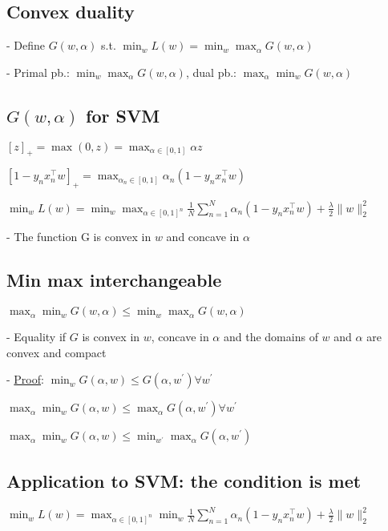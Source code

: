\subsection*{Convex duality}
- Define $G(w, \alpha)$ s.t.
$
\min _{w} L(w)=\min _{w} \max _{\alpha} G(w, \alpha)
$

- Primal pb.: $\min _{w} \max _{\alpha} G(w, \alpha)$, dual pb.: $\max _{\alpha} \min _{w} G(w, \alpha)$


\subsection*{$G(w, \alpha)$ for SVM}
$
[z]_{+}=\max (0, z)=\max _{\alpha \in[0,1]} \alpha z
$

$\left[1-y_{n} x_{n}^{\top} w\right]_{+}=\max _{\alpha_{n} \in[0,1]} \alpha_{n}\left(1-y_{n} x_{n}^{\top} w\right)$

$
\min _{w} L(w)=\min _{w} \max _{\alpha \in[0,1]^{n}} \frac{1}{N} \sum_{n=1}^{N} \alpha_{n}\left(1-y_{n} x_{n}^{\top} w\right)+\frac{\lambda}{2}\|w\|_{2}^{2}
$

- The function $\mathrm{G}$ is convex in $w$ and concave in $\alpha$

\subsection*{Min max interchangeable}

$
\max _{\alpha} \min _{w} G(w, \alpha) \leq \min _{w} \max _{\alpha} G(w, \alpha)
$

- Equality if $G$ is convex in $w$, concave in $\alpha$ and the domains of $w$ and $\alpha$ are convex and compact


- \underline{Proof}:
$\min_w G(\alpha, w) \leq G\left(\alpha, w^{\prime}\right) \forall w^{\prime}$


$\max_\alpha \min_w G(\alpha, w) \leq \max_\alpha G\left(\alpha, w^{\prime}\right) \forall w^{\prime}$


$\max_\alpha \min_w G(\alpha, w) \leq \min_{w^\prime} \max_\alpha G\left(\alpha, w^{\prime}\right)$

\subsection*{Application to SVM: the condition is met}
$
\min _{w} L(w)=\max _{\alpha \in[0,1]^{n}} \min _{w} \frac{1}{N} \sum_{n=1}^{N} \alpha_{n}\left(1-y_{n} x_{n}^{\top} w\right)+\frac{\lambda}{2}\|w\|_{2}^{2}
$

